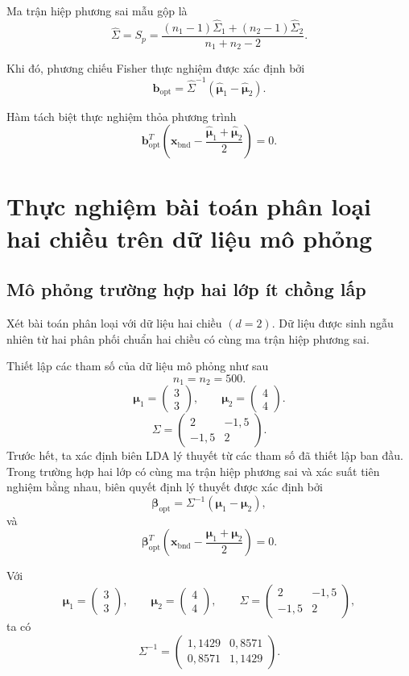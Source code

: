 Ma trận hiệp phương sai mẫu gộp là
\[
\hat{\Sigma}
=
S_p
=
\frac{(n_1-1)\hat{\Sigma}_1+(n_2-1)\hat{\Sigma}_2}{n_1+n_2-2}.
\]

Khi đó, phương chiếu Fisher thực nghiệm được xác định bởi
\[
\bm{b}_{\text{opt}}
=
\hat{\Sigma}^{-1}(\hat{\bm{\mu}}_1-\hat{\bm{\mu}}_2).
\]

Hàm tách biệt thực nghiệm thỏa phương trình
\begin{equation}
	\bm{b}_{\text{opt}}^T
	\left(
	\bm{x}_{\text{bnd}}
	-
	\frac{\widehat{\bm{\mu}}_1+\widehat{\bm{\mu}}_2}{2}
	\right)
	=
	0.
	\tag{2.3}
\end{equation}

\section{Thực nghiệm bài toán phân loại hai chiều trên dữ liệu mô phỏng}
\subsection{Mô phỏng trường hợp hai lớp ít chồng lấp}

Xét bài toán phân loại với dữ liệu hai chiều $(d=2)$. Dữ liệu được sinh ngẫu nhiên từ hai phân phối chuẩn hai chiều có cùng ma trận hiệp phương sai.

Thiết lập các tham số của dữ liệu mô phỏng như sau
\[
n_1=n_2=500.
\]
\[
\bm{\mu}_1=
\begin{pmatrix}
	3\\
	3
\end{pmatrix},
\qquad
\bm{\mu}_2=
\begin{pmatrix}
	4\\
	4
\end{pmatrix}.
\]
\[
\Sigma
=
\begin{pmatrix}
2 & -1{,}5\\
-1{,}5 & 2
\end{pmatrix}.
\]
Trước hết, ta xác định biên LDA lý thuyết từ các tham số đã thiết lập ban đầu. Trong trường hợp hai lớp có cùng ma trận hiệp phương sai và xác suất tiên nghiệm bằng nhau, biên quyết định lý thuyết được xác định bởi
\[
\bm{\beta}_{\text{opt}}
=
\Sigma^{-1}(\bm{\mu}_1-\bm{\mu}_2),
\]
và
\[
\bm{\beta}_{\text{opt}}^T
\left(
\bm{x}_{\text{bnd}}
-
\frac{\bm{\mu}_1+\bm{\mu}_2}{2}
\right)
=
0.
\]

Với
\[
\bm{\mu}_1=
\begin{pmatrix}
	3\\
	3
\end{pmatrix},
\qquad
\bm{\mu}_2=
\begin{pmatrix}
	4\\
	4
\end{pmatrix},
\qquad
\Sigma=
\begin{pmatrix}
	2 & -1{,}5\\
	-1{,}5 & 2
\end{pmatrix},
\]
ta có
\[
\Sigma^{-1}
=
\begin{pmatrix}
	1{,}1429 & 0{,}8571\\
	0{,}8571 & 1{,}1429
\end{pmatrix}.
\]

